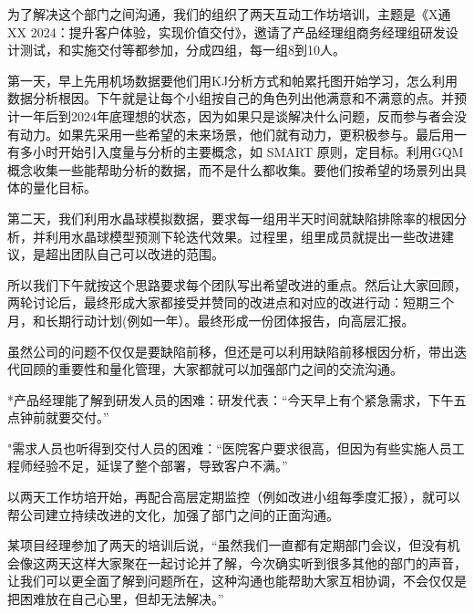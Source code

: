 为了解决这个部门之间沟通，我们的组织了两天互动工作坊培训，主题是《X通XX
2024：提升客户体验，实现价值交付》，邀请了产品经理组商务经理组研发设计测试，和实施交付等都参加，分成四组，每一组8到10人。

第一天，早上先用机场数据要他们用KJ分析方式和帕累托图开始学习，怎么利用数据分析根因。下午就是让每个小组按自己的角色列出他满意和不满意的点。并预计一年后到2024年底理想的状态，因为如果只是谈解决什么问题，反而参与者会没有动力。如果先采用一些希望的未来场景，他们就有动力，更积极参与。最后用一有多小时开始引入度量与分析的主要概念，如
SMART
原则，定目标。利用GQM概念收集一些能帮助分析的数据，而不是什么都收集。要他们按希望的场景列出具体的量化目标。

第二天，我们利用水晶球模拟数据，要求每一组用半天时间就缺陷排除率的根因分析，并利用水晶球模型预测下轮迭代效果。过程里，组里成员就提出一些改进建议，是超出团队自己可以改进的范围。


所以我们下午就按这个思路要求每个团队写出希望改进的重点。然后让大家回顾，两轮讨论后，最终形成大家都接受并赞同的改进点和对应的改进行动：短期三个月，和长期行动计划(例如一年）。最终形成一份团体报告，向高层汇报。

虽然公司的问题不仅仅是要缺陷前移，但还是可以利用缺陷前移根因分析，带出迭代回顾的重要性和量化管理，大家都就可以加强部门之间的交流沟通。

*产品经理能了解到研发人员的困难：研发代表：“今天早上有个紧急需求，下午五点钟前就要交付。”

"需求人员也听得到交付人员的困难：“医院客户要求很高，但因为有些实施人员工程师经验不足，延误了整个部署，导致客户不满。”

以两天工作坊培开始，再配合高层定期监控（例如改进小组每季度汇报），就可以帮公司建立持续改进的文化，加强了部门之间的正面沟通。

某项目经理参加了两天的培训后说，``虽然我们一直都有定期部门会议，但没有机会像这两天这样大家聚在一起讨论并了解，今次确实听到很多其他的部门的声音，让我们可以更全面了解到问题所在，这种沟通也能帮助大家互相协调，不会仅仅是把困难放在自己心里，但却无法解决。''

